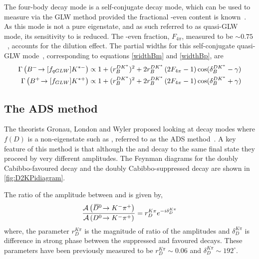 The four-body \D decay mode \decay{\D}{\pip\pim\pip\pim} is a self-conjugate decay mode, which can be used to measure \Pgamma via the GLW method provided the fractional \CP-even content is known~\cite{NAYAK20151}. As this mode is not a pure \CP eigenstate, and as such referred to as quasi-GLW mode, its sensitivity to \Pgamma is reduced. The \CP-even fraction, $F_{4\pi}$, measured to be $\sim 0.75$~\cite{charm4pi}, accounts for the dilution effect. The partial widths for this self-conjugate quasi-GLW mode~\cite{NAYAK20151,charm4pi}, corresponding to equations \ref{widthBm} and \ref{widthBp}, are
\begin{align}
\Gamma\left({{{B}^-}}\!\rightarrow [f_{qGLW}]{\ensuremath{{K}^{*-}}}\right) \propto 1 + (r_B^{DK^*})^2 + 2r_B^{DK^*}\left(2F_{4\pi} - 1\right)\cos(\delta_B^{DK^*} - \gamma) \label{widthBm4body} \\
\Gamma\left({{{B}^+}}\!\rightarrow [f_{GLW}]{\ensuremath{{K}^{*+}}}\right) \propto 1 + (r_B^{DK^*})^2 + 2r_B^{DK^*}\left(2F_{4\pi} - 1\right)\cos(\delta_B^{DK^*} + \gamma) \label{widthBp4body}
\end{align}


\subsection{The ADS method}
\label{sec:theory:ads}

The theorists Gronau, London and Wyler proposed looking at \D decay modes where $f(D)$ is a non-\CP eigenstate such as \decay{\D}{\Km\pip}, referred to as the ADS method~\cite{ADS,ADS-2001}. A key feature of this method is that although the \Dz and \Dzb decay to the same final state they proceed by very different amplitudes. The Feynman diagrams for the doubly Cabibbo-favoured \decay{\Dz}{\Km\pip} decay and the doubly Cabibbo-suppressed \decay{\Dz}{\Kp\pim} decay are shown in \fig\ref{fig:D2KPidiagram}.


The ratio of the amplitude between \decay{\Dzb}{\Km\pip} and \decay{\Dz}{\Km\pip} is given by,
\begin{equation}
\frac{\mathcal{A}\left({{\kern 0.2em\overline{\kern -0.2em D}{}}{}^0}\!\rightarrow {\ensuremath{{K}^-}}{\ensuremath{{\pi}^+}}\right)}{\mathcal{A}\left({{D}^0}\!\rightarrow {\ensuremath{{K}^-}}{\ensuremath{{\pi}^+}}\right)} = r_D^{K\pi}e^{-i\delta_D^{K\pi}}
\label{ratioads}
\end{equation}
where, the parameter $r_D^{K\pi}$ is the magnitude of ratio of the amplitudes and $\delta_D^{K\pi}$ is difference in strong phase between the suppressed and favoured decays. These parameters have been previously measured to be $r_D^{K\pi} \sim 0.06$ and $\delta_D^{K\pi} \sim 192^{\circ}$.

